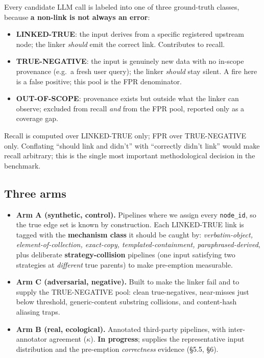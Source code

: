 \documentclass[11pt]{article}
\begin{document}
Every candidate LLM call is labeled into one of three ground-truth classes, because \textbf{a non-link is
not always an error}:
\begin{itemize}[leftmargin=*]
\item \textbf{LINKED-TRUE}: the input derives from a specific registered upstream node; the linker
\emph{should} emit the correct link. Contributes to recall.
\item \textbf{TRUE-NEGATIVE}: the input is genuinely new data with no in-scope provenance (e.g.\ a fresh
user query); the linker \emph{should} stay silent. A fire here is a false positive; this pool is the FPR
denominator.
\item \textbf{OUT-OF-SCOPE}: provenance exists but outside what the linker can observe; excluded from
recall \emph{and} from the FPR pool, reported only as a coverage gap.
\end{itemize}
Recall is computed over LINKED-TRUE only; FPR over TRUE-NEGATIVE only. Conflating ``should link and didn't''
with ``correctly didn't link'' would make recall arbitrary; this is the single most important methodological
decision in the benchmark.

\subsection{Three arms}
\begin{itemize}[leftmargin=*]
\item \textbf{Arm A (synthetic, control).} Pipelines where we assign every \texttt{node\_id}, so the true
edge set is known by construction. Each LINKED-TRUE link is tagged with the \textbf{mechanism class} it
should be caught by: \emph{verbatim-object, element-of-collection, exact-copy, templated-containment,
paraphrased-derived}, plus deliberate \textbf{strategy-collision} pipelines (one input satisfying two
strategies at \emph{different} true parents) to make pre-emption measurable.
\item \textbf{Arm C (adversarial, negative).} Built to make the linker fail and to supply the TRUE-NEGATIVE
pool: clean true-negatives, near-misses just below threshold, generic-content substring collisions, and
content-hash aliasing traps.
\item \textbf{Arm B (real, ecological).} Annotated third-party pipelines, with inter-annotator agreement
($\kappa$). \textbf{In progress}; supplies the representative input distribution and the pre-emption
\emph{correctness} evidence (\S5.5, \S6).
\end{itemize}
\end{document}

